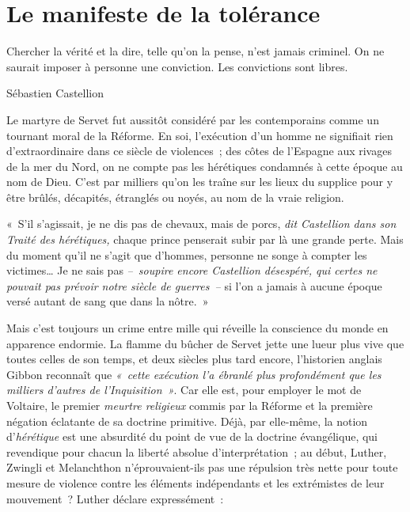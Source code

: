 \documentclass[french,twoside]{book} %
\newcommand{\bibl}[1]{{\smallskip\setlength{\RaggedLeftLeftskip}{2em plus \leftskip}\RaggedLeft\normalsize\normalfont #1\par\medskip}}}
\newenvironment{epigraph}{\leftskip1.5\parindent \sffamily\large}{\bigskip}
\newenvironment{quoteblock}%
  {\begin{quoting}}
  {\end{quoting}}
\newcommand\chapteropen{} %
\newcommand\chaptercont{} %
\newenvironment{quotebar}{%
    \def\FrameCommand{{\color{rubric!10!}\vrule width 0.5em} \hspace{0.9em}}%
    \def\OuterFrameSep{0pt} %
    \MakeFramed {\advance\hsize-\width \FrameRestore}
  }%
  {%
    \endMakeFramed
  }
\renewenvironment{quoteblock}%
  {%
    \savenotes
    \setstretch{0.9}
    \normalfont
    \begin{quotebar}
  }
  {%
    \end{quotebar}
    \spewnotes
  }
\begin{document}
\chapteropen

\chapter[{Le manifeste de la tolérance}]{Le manifeste de la tolérance}
\renewcommand{\leftmark}{Le manifeste de la tolérance}


\begin{epigraph}
\noindent Chercher la vérité et la dire, telle qu’on la pense, n’est jamais criminel. On ne saurait imposer à personne une conviction. Les convictions sont libres.\par

\bibl{Sébastien Castellion}
\end{epigraph}


\chaptercont
\noindent Le martyre de Servet fut aussitôt considéré par les contemporains comme un tournant moral de la Réforme. En soi, l’exécution d’un homme ne signifiait rien d’extraordinaire dans ce siècle de violences ; des côtes de l’Espagne aux rivages de la mer du Nord, on ne compte pas les hérétiques condamnés à cette époque au nom de Dieu. C’est par milliers qu’on les traîne sur les lieux du supplice pour y être brûlés, décapités, étranglés ou noyés, au nom de la vraie religion.\par

\begin{quoteblock}
\noindent « S’il s’agissait, je ne dis pas de chevaux, mais de porcs, \emph{dit Castellion dans son \emph{Traité des hérétiques}, }chaque prince penserait subir par là une grande perte. Mais du moment qu’il ne s’agit que d’hommes, personne ne songe à compter les victimes… Je ne sais pas \emph{– soupire encore Castellion désespéré, qui certes ne pouvait pas prévoir notre siècle de guerres –} si l’on a jamais à aucune époque versé autant de sang que dans la nôtre. »\end{quoteblock}

\noindent Mais c’est toujours un crime entre mille qui réveille la conscience du monde en apparence endormie. La flamme du bûcher de Servet jette une lueur plus vive que toutes celles de son temps, et deux siècles plus tard encore, l’historien anglais Gibbon reconnaît que \emph{« cette exécution l’a ébranlé plus profondément que les milliers d’autres de l’Inquisition »}. Car elle est, pour employer le mot de Voltaire, le premier \emph{meurtre religieux} commis par la Réforme et la première négation éclatante de sa doctrine primitive. Déjà, par elle-même, la notion d’\emph{hérétique} est une absurdité du point de vue de la doctrine évangélique, qui revendique pour chacun la liberté absolue d’interprétation ; au début, Luther, Zwingli et Melanchthon n’éprouvaient-ils pas une répulsion très nette pour toute mesure de violence contre les éléments indépendants et les extrémistes de leur mouvement ? Luther déclare expressément :\par
\end{document}
